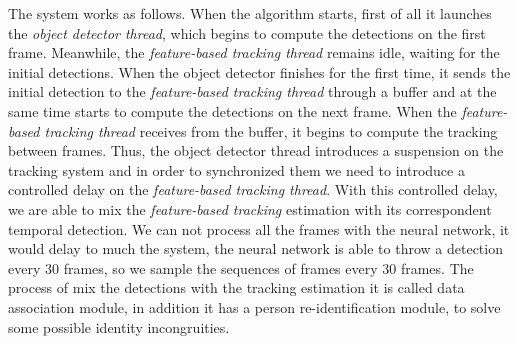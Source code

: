 

The system works as follows. When the algorithm starts, first of all it launches the \textit{object detector thread}, which begins to compute the detections on the first frame. Meanwhile, the \textit{feature-based tracking thread} remains idle, waiting for the initial detections. When the object detector finishes for the first time, it sends the initial detection to the \textit{feature-based tracking thread} through a buffer and at the same time starts to compute the detections on the next frame. When the \textit{feature-based tracking thread} receives from the buffer, it begins to compute the tracking between frames. Thus, the object detector thread introduces a suspension on the tracking system and in order to synchronized them we need to introduce a controlled delay on the \textit{feature-based tracking thread}. With this controlled delay, we are able to mix the \textit{feature-based tracking} estimation with its correspondent temporal detection. We can not process all the frames with the neural network, it would delay to much the system, the neural network is able to throw a detection every $30$ frames, so we sample the sequences of frames every $30$ frames. The process of mix the detections with the tracking estimation it is called data association module, in addition it has a person re-identification module, to solve some possible identity incongruities.

